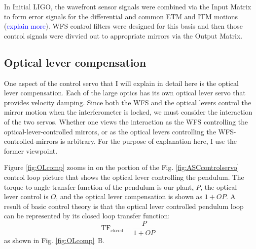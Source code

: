 In Initial LIGO, the wavefront sensor signals were combined via the Input Matrix to form error signals for the differential and common ETM and ITM motions (\textcolor{blue}{explain more}). WFS control filters were designed for this basis and then those control signals were divvied out to appropriate mirrors via the Output Matrix. 



\subsection{Optical lever compensation}
\label{sec:oplevcomp}
One aspect of the control servo that I will explain in detail here is the optical lever compensation.  Each of the large optics has its own optical lever servo that provides velocity damping. Since both the WFS and the optical levers control the mirror motion when the interferometer is locked, we must consider the interaction of the two servos. Whether one views the interaction as the WFS controlling the optical-lever-controlled mirrors, or as the optical levers controlling the WFS-controlled-mirrors is arbitrary. For the purpose of explanation here, I use the former viewpoint.

Figure \ref{fig:OLcomp} zooms in on the portion of the Fig. \ref{fig:ASCcontrolservo} control loop picture that shows the optical lever controlling the pendulum. The torque to angle transfer function of the pendulum is our plant, $P$, the optical lever control is $O$, and the optical lever compensation is shown as $1+OP$. A result of basic control theory is that the optical lever controlled pendulum loop can be represented by its closed loop transfer function:
\begin{equation}
\mathrm{TF_{closed}} = \frac{P}{1+OP}
\end{equation}
as shown in Fig. \ref{fig:OLcomp}~B. 

